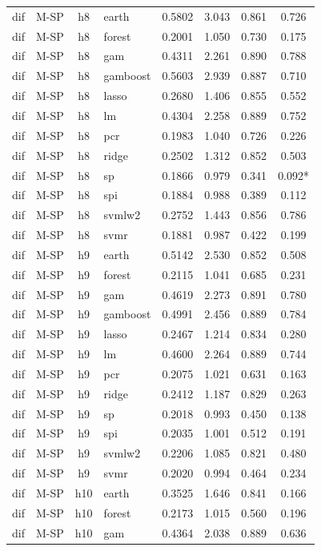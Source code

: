 \begin{ThreePartTable}
\begin{longtable}[t]{llclcccc}
dif & M-SP & h8 & earth & 0.5802 & 3.043 & 0.861 & 0.726\\
dif & M-SP & h8 & forest & 0.2001 & 1.050 & 0.730 & 0.175\\
dif & M-SP & h8 & gam & 0.4311 & 2.261 & 0.890 & 0.788\\
dif & M-SP & h8 & gamboost & 0.5603 & 2.939 & 0.887 & 0.710\\
dif & M-SP & h8 & lasso & 0.2680 & 1.406 & 0.855 & 0.552\\
dif & M-SP & h8 & lm & 0.4304 & 2.258 & 0.889 & 0.752\\
dif & M-SP & h8 & pcr & 0.1983 & 1.040 & 0.726 & 0.226\\
dif & M-SP & h8 & ridge & 0.2502 & 1.312 & 0.852 & 0.503\\
dif & M-SP & h8 & sp & 0.1866 & 0.979 & 0.341 & 0.092*\\
dif & M-SP & h8 & spi & 0.1884 & 0.988 & 0.389 & 0.112\\
dif & M-SP & h8 & svmlw2 & 0.2752 & 1.443 & 0.856 & 0.786\\
dif & M-SP & h8 & svmr & 0.1881 & 0.987 & 0.422 & 0.199\\
\addlinespace
dif & M-SP & h9 & earth & 0.5142 & 2.530 & 0.852 & 0.508\\
dif & M-SP & h9 & forest & 0.2115 & 1.041 & 0.685 & 0.231\\
dif & M-SP & h9 & gam & 0.4619 & 2.273 & 0.891 & 0.780\\
dif & M-SP & h9 & gamboost & 0.4991 & 2.456 & 0.889 & 0.784\\
dif & M-SP & h9 & lasso & 0.2467 & 1.214 & 0.834 & 0.280\\
dif & M-SP & h9 & lm & 0.4600 & 2.264 & 0.889 & 0.744\\
dif & M-SP & h9 & pcr & 0.2075 & 1.021 & 0.631 & 0.163\\
dif & M-SP & h9 & ridge & 0.2412 & 1.187 & 0.829 & 0.263\\
dif & M-SP & h9 & sp & 0.2018 & 0.993 & 0.450 & 0.138\\
dif & M-SP & h9 & spi & 0.2035 & 1.001 & 0.512 & 0.191\\
dif & M-SP & h9 & svmlw2 & 0.2206 & 1.085 & 0.821 & 0.480\\
dif & M-SP & h9 & svmr & 0.2020 & 0.994 & 0.464 & 0.234\\
\addlinespace
dif & M-SP & h10 & earth & 0.3525 & 1.646 & 0.841 & 0.166\\
dif & M-SP & h10 & forest & 0.2173 & 1.015 & 0.560 & 0.196\\
dif & M-SP & h10 & gam & 0.4364 & 2.038 & 0.889 & 0.636\\

\end{longtable}
\end{ThreePartTable}
